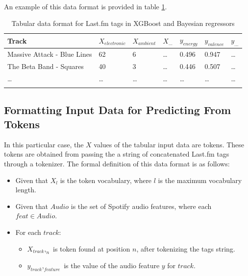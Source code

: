 \documentclass[sn-mathphys]{sn-jnl}%
\theoremstyle{thmstyleone}%
\theoremstyle{thmstyletwo}%
\theoremstyle{thmstylethree}%
\begin{document}
An example of this data format is provided in table \ref{tabular_tags_format}.

\begin{table}[h]
      \begin{center}
      \begin{minipage}{\textwidth}
      \caption{Tabular data format for Last.fm tags in XGBoost and Bayesian regressors}\label{tabular_tags_format}%
      \begin{tabular}{@{}lllllll@{}}
      \toprule
      Track                         & $X_{electronic}$ & $X_{ambient}$ & $X_{\dots}$ & $y_{energy}$ & $y_{valence}$ & $y_{\dots}$ \\
      \midrule
      Massive Attack - Blue Lines   & 62               & 6             &  \dots      & 0.496        & 0.947         & \dots  \\
      The Beta Band - Squares       & 40               & 3             &  \dots      & 0.446        & 0.507         & \dots  \\
      \dots                         & \dots            & \dots         &  \dots      & \dots        & \dots         & \dots  \\
      \botrule
      \end{tabular}
      \end{minipage}
      \end{center}
\end{table}

\subsection{Formatting Input Data for Predicting From Tokens}

In this particular case, the $X$ values of the tabular input data are tokens.
These tokens are obtained from passing the a string of concatenated Last.fm tags through a tokenizer.
The formal definition of this data format is as follows:

\begin{itemize}
      \item Given that $X_l$ is the token vocabulary, where $l$ is the maximum vocabulary length.
      \item Given that $Audio$ is the set of Spotify audio features, where each $feat \in Audio$.
      \item For each $track$:
      \begin{itemize}
            \item $X_{track},_{n}$ is token found at position $n$, after tokenizing the tags string.
            \item $y_{track},_{feature}$ is the value of the audio feature $y$ for $track$.
      \end{itemize}
\end{itemize}
\end{document}
